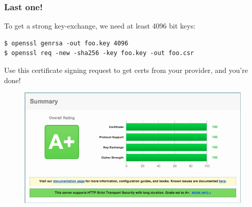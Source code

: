 \documentclass[9pt]{beamer}
\begin{document}
\begin{frame}[fragile]
\frametitle{Last one!}
To get a strong key-exchange, we need at least 4096 bit keys:
\begin{verbatim}
$ openssl genrsa -out foo.key 4096
$ openssl req -new -sha256 -key foo.key -out foo.csr
\end{verbatim}
Use this certificate signing request to get certs from your provider, and you're done!
\begin{figure}
\includegraphics[scale=0.25]{figures/App.png}
\end{figure}
\end{frame}
\end{document}
